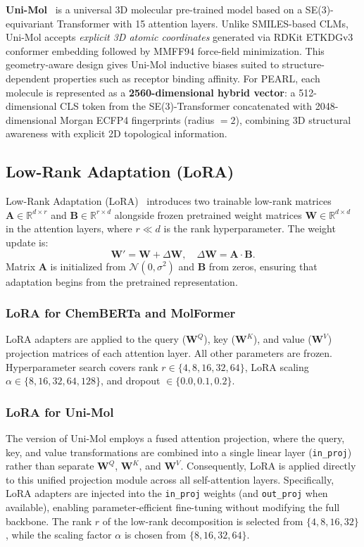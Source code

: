 \documentclass[pdflatex,sn-mathphys-num]{sn-jnl}%
\theoremstyle{thmstyleone}%
\theoremstyle{thmstyletwo}%
\theoremstyle{thmstylethree}%
\begin{document}
\textbf{Uni-Mol}~\cite{zhou2023unimol} is a universal 3D molecular pre-trained model based on a SE(3)-equivariant Transformer with 15 attention layers. Unlike SMILES-based CLMs, Uni-Mol accepts \emph{explicit 3D atomic coordinates} generated via RDKit ETKDGv3 conformer embedding followed by MMFF94 force-field minimization.
This geometry-aware design gives Uni-Mol inductive biases suited to structure-dependent properties such as receptor binding affinity. For PEARL, each molecule is represented as a \textbf{2560-dimensional hybrid vector}: a 512-dimensional CLS token from the SE(3)-Transformer concatenated with 2048-dimensional Morgan ECFP4 fingerprints (radius $= 2$), combining 3D structural awareness with explicit 2D topological information.

\subsection{Low-Rank Adaptation (LoRA)}\label{sec:lora}
Low-Rank Adaptation (LoRA)~\cite{hu2021lora} introduces two trainable low-rank matrices $\mathbf{A} \in \mathbb{R}^{d \times r}$ and $\mathbf{B} \in \mathbb{R}^{r \times d}$ alongside frozen pretrained weight matrices $\mathbf{W} \in \mathbb{R}^{d \times d}$ in the attention layers, where $r \ll d$ is the rank hyperparameter. The weight update is: 
\begin{equation}
  \mathbf{W}' = \mathbf{W} + \Delta\mathbf{W}, \quad \Delta\mathbf{W} = \mathbf{A} \cdot \mathbf{B}.
\end{equation}
Matrix $\mathbf{A}$ is initialized from $\mathcal{N}(0, \sigma^2)$ and $\mathbf{B}$ from zeros, ensuring that adaptation begins from the pretrained representation.

\subsubsection{LoRA for ChemBERTa and MolFormer}
LoRA adapters are applied to the query ($\mathbf{W}^Q$), key ($\mathbf{W}^K$), and value ($\mathbf{W}^V$) projection matrices of each attention layer. All other parameters are frozen. Hyperparameter search covers rank $r \in \{4, 8, 16, 32, 64\}$, LoRA scaling $\alpha \in \{8, 16, 32, 64, 128\}$, and dropout $\in \{0.0, 0.1, 0.2\}$.

\subsubsection{LoRA for Uni-Mol} The version of Uni-Mol employs a fused attention projection, where the query, key, and value transformations are combined into a single linear layer (\texttt{in\_proj}) rather than separate $\mathbf{W}^Q$, $\mathbf{W}^K$, and $\mathbf{W}^V$. Consequently, LoRA is applied directly to this unified projection module across all self-attention layers.
Specifically, LoRA adapters are injected into the \texttt{in\_proj} weights (and \texttt{out\_proj} when available), enabling parameter-efficient fine-tuning without modifying the full backbone. The rank $r$ of the low-rank decomposition is selected from $\{4, 8, 16, 32\}$, while the scaling factor $\alpha$ is chosen from $\{8, 16, 32, 64\}$. 
\end{document}
